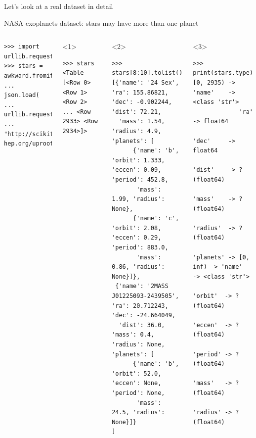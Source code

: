 \documentclass[aspectratio=169]{beamer}
\begin{document}
\begin{frame}{}
\LARGE
\vspace{1 cm}
\begin{center}
Let's look at a real dataset in detail
\end{center}
\end{frame}

\begin{frame}[fragile]{NASA exoplanets dataset: stars may have more than one planet}
\begin{columns}
\small
\begin{verbatim}
>>> import urllib.request
>>> stars = awkward.fromiter(
...     json.load(
...         urllib.request.urlopen(
...            "http://scikit-hep.org/uproot/examples/exoplanets.json")))
\end{verbatim}

\begin{onlyenv}<1>
\begin{verbatim}
>>> stars
<Table [<Row 0> <Row 1> <Row 2> ... <Row 2933> <Row 2934>]>
\end{verbatim}

\vspace{10 cm}
\end{onlyenv}
\begin{onlyenv}<2>
\begin{verbatim}
>>> stars[8:10].tolist()
[{'name': '24 Sex', 'ra': 155.86821, 'dec': -0.902244, 'dist': 72.21,
  'mass': 1.54, 'radius': 4.9, 'planets': [
      {'name': 'b', 'orbit': 1.333, 'eccen': 0.09, 'period': 452.8,
       'mass': 1.99, 'radius': None},
      {'name': 'c', 'orbit': 2.08, 'eccen': 0.29, 'period': 883.0,
       'mass': 0.86, 'radius': None}]},
 {'name': '2MASS J01225093-2439505', 'ra': 20.712243, 'dec': -24.664049,
  'dist': 36.0, 'mass': 0.4, 'radius': None, 'planets': [
      {'name': 'b', 'orbit': 52.0, 'eccen': None, 'period': None,
       'mass': 24.5, 'radius': None}]}
]
\end{verbatim}

\vspace{10 cm}
\end{onlyenv}
\begin{onlyenv}<3>
\small
\vspace{-0.6 cm}
\begin{verbatim}
>>> print(stars.type)
[0, 2935) -> 'name'    -> <class 'str'>
             'ra'      -> float64
             'dec'     -> float64
             'dist'    -> ?(float64)
             'mass'    -> ?(float64)
             'radius'  -> ?(float64)
             'planets' -> [0, inf) -> 'name'   -> <class 'str'>
                                      'orbit'  -> ?(float64)
                                      'eccen'  -> ?(float64)
                                      'period' -> ?(float64)
                                      'mass'   -> ?(float64)
                                      'radius' -> ?(float64)
\end{verbatim}


\end{onlyenv}
\end{columns}
\end{frame}
\end{document}
